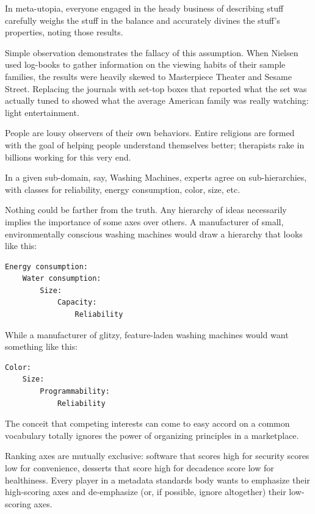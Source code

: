 \documentclass[a4paper,landscape,headrule,footrule,xetex]{foils}
\begin{document}

In meta-utopia, everyone engaged in the heady business of describing
stuff carefully weighs the stuff in the balance and accurately divines
the stuff's properties, noting those results.

Simple observation demonstrates the fallacy of this assumption. When
Nielsen used log-books to gather information on the viewing habits of
their sample families, the results were heavily skewed to Masterpiece
Theater and Sesame Street. Replacing the journals with set-top boxes
that reported what the set was actually tuned to showed what the
average American family was really watching: light entertainment.

People are lousy observers of their own behaviors. Entire religions
are formed with the goal of helping people understand themselves
better; therapists rake in billions working for this very end.



In a given sub-domain, say, Washing Machines, experts agree on
sub-hierarchies, with classes for reliability, energy consumption,
color, size, etc.

Nothing could be farther from the truth. Any hierarchy of ideas necessarily implies the importance of some axes over others. A manufacturer of small, environmentally conscious washing machines would draw a hierarchy that looks like this:
\begin{verbatim}
Energy consumption:
    Water consumption:
        Size:
            Capacity:
                Reliability

\end{verbatim}
\newpage
While a manufacturer of glitzy, feature-laden washing machines would want something like this:
\begin{verbatim}
Color:
    Size:
        Programmability:
            Reliability
\end{verbatim}

The conceit that competing interests can come to easy accord on a common vocabulary totally ignores the power of organizing principles in a marketplace.


Ranking axes are mutually exclusive: software that scores high for
security scores low for convenience, desserts that score high for
decadence score low for healthiness. Every player in a metadata
standards body wants to emphasize their high-scoring axes and
de-emphasize (or, if possible, ignore altogether) their low-scoring
axes.
\end{document}
